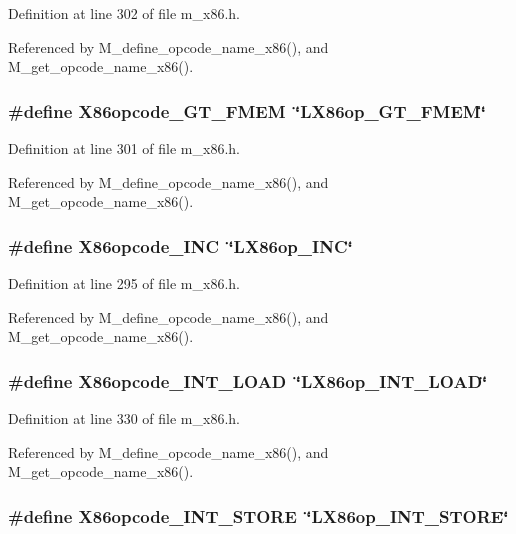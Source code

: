 Definition at line 302 of file m\_\-x86.h.

Referenced by M\_\-define\_\-opcode\_\-name\_\-x86(), and M\_\-get\_\-opcode\_\-name\_\-x86().
\subsubsection{\setlength{\rightskip}{0pt plus 5cm}\#define X86opcode\_\-GT\_\-FMEM~\char`\"{}LX86op\_\-GT\_\-FMEM\char`\"{}}\label{m__x86_8h_ce70941eba2ae390aa74ddf6d5187a09}




Definition at line 301 of file m\_\-x86.h.

Referenced by M\_\-define\_\-opcode\_\-name\_\-x86(), and M\_\-get\_\-opcode\_\-name\_\-x86().
\subsubsection{\setlength{\rightskip}{0pt plus 5cm}\#define X86opcode\_\-INC~\char`\"{}LX86op\_\-INC\char`\"{}}\label{m__x86_8h_e75374216449cd971d584949747e27cd}




Definition at line 295 of file m\_\-x86.h.

Referenced by M\_\-define\_\-opcode\_\-name\_\-x86(), and M\_\-get\_\-opcode\_\-name\_\-x86().
\subsubsection{\setlength{\rightskip}{0pt plus 5cm}\#define X86opcode\_\-INT\_\-LOAD~\char`\"{}LX86op\_\-INT\_\-LOAD\char`\"{}}\label{m__x86_8h_fbe06d26f386d87d034cc6132926fba8}




Definition at line 330 of file m\_\-x86.h.

Referenced by M\_\-define\_\-opcode\_\-name\_\-x86(), and M\_\-get\_\-opcode\_\-name\_\-x86().
\subsubsection{\setlength{\rightskip}{0pt plus 5cm}\#define X86opcode\_\-INT\_\-STORE~\char`\"{}LX86op\_\-INT\_\-STORE\char`\"{}}\label{m__x86_8h_de65d5fc2996f0387f22db884b3872fb}




